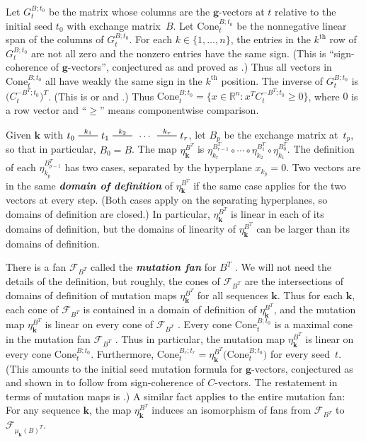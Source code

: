 \documentclass{amsart}
\theoremstyle{definition}
\theoremstyle{remark}
\numberwithin{equation}{section}
\newcommand{\newword}[1]{\textbf{\emph{#1}}}
\newcommand{\reals}{\mathbb R}
\newcommand{\edge}{\,\,\rule[2.7pt]{20pt}{0.5pt}\,\,}
\newcommand{\set}[1]{{\lbrace #1 \rbrace}}
\newcommand{\sett}[1]{{\bigl\lbrace #1 \bigr\rbrace}}
\newcommand{\F}{{\mathcal F}}
\renewcommand{\th}{^\text{th}}
\newcommand{\0}{{\mathbf{0}}}
\newcommand{\Cone}{\mathrm{Cone}}
\newcommand{\g}{\mathbf{g}}
\newcommand{\kk}{{\boldsymbol{k}}}
\renewcommand{\th}{^\text{th}}
\begin{document}
Let $G_t^{B;t_0}$ be the matrix whose columns are the $\g$-vectors at $t$ relative to the initial seed $t_0$ with exchange matrix~$B$.
Let $\Cone^{B;t_0}_t$ be the nonnegative linear span of the columns of $G_t^{B;t_0}$.
For each $k\in\set{1,\ldots,n}$, the entries in the $k\th$ row of $G_t^{B;t_0}$ are not all zero and the nonzero entries have the same sign.
(This is ``sign-coherence of $\g$-vectors'', conjectured as \cite[Conjecture~6.13]{ca4} and proved as \cite[Theorem 5.11]{GHKK}.)
Thus all vectors in $\Cone^{B;t_0}_t$ all have weakly the same sign in the $k\th$ position.
The inverse of $G_t^{B;t_0}$ is $\bigl(C_t^{-B^T;t_0}\bigr)^T$.
(This is \cite[Theorem~1.2]{NZ} or \cite[Theorem~1.1]{framework} and \cite[Theorem~3.30]{framework}.)
Thus $\Cone^{B;t_0}_t=\sett{x\in\reals^n:x^TC_t^{-B^T;t_0}\ge0}$, where $0$ is a row vector and ``$\ge$'' means componentwise comparison. 

Given $\kk$ with $t_0\overset{k_1}{\edge}t_1\overset{k_2}{\edge}\,\cdots\,\overset{k_r}{\edge}t_r$, let $B_p$ be the exchange matrix at~$t_p$, so that in particular, $B_0=B$.
The map $\eta_{\kk}^{B^T}$ is ${\eta_{k_r}^{B_{r-1}^T}\circ\cdots\circ\eta_{k_2}^{B_1^T}\circ\eta_{k_1}^{B_0^T}}$.
The definition of each $\eta_{k_p}^{B_{p-1}^T}$ has two cases, separated by the hyperplane $x_{k_p}=0$.
Two vectors are in the same \newword{domain of definition} of $\eta_\kk^{B^T}$ if the same case applies for the two vectors at every step.
(Both cases apply on the separating hyperplanes, so domains of definition are closed.)
In particular, $\eta_\kk^{B^T}$ is linear in each of its domains of definition, but the domains of linearity of $\eta_\kk^{B^T}$ can be larger than its domains of definition.

There is a fan $\F_{B^T}$ called the \newword{mutation fan} for $B^T$ \cite[Definition~5.12]{universal}.
We will not need the details of the definition, but roughly, the cones of $\F_{B^T}$ are the intersections of domains of definition of mutation maps $\eta_\kk^{B^T}$ for all sequences $\kk$.
Thus for each $\kk$, each cone of $\F_{B^T}$ is contained in a domain of definition of $\eta_\kk^{B^T}$, and the mutation map $\eta_\kk^{B^T}$ is linear on every cone of $\F_{B^T}$ \cite[Proposition~5.3]{universal}.
Every cone $\Cone^{B;t_0}_t$ is a maximal cone in the mutation fan $\F_{B^T}$ \cite[Proposition~8.13]{universal}.
Thus in particular, the mutation map $\eta_\kk^{B^T}$ is linear on every cone $\Cone^{B;t_0}_t$.
Furthermore, $\Cone_t^{B_r;t_r}=\eta_\kk^{B^T}\bigl(\Cone_t^{B;t_0}\bigr)$ for every seed~$t$.
(This amounts to the initial seed mutation formula for $\g$-vectors, conjectured as \cite[Conjecture~7.12]{ca4} and shown in \cite[Proposition~4.2(v)]{NZ} to follow from sign-coherence of $C$-vectors.
The restatement in terms of mutation maps is \cite[Conjecture~8.11]{universal}.)
A similar fact applies to the entire mutation fan:
For any sequence $\kk$, the map $\eta_\kk^{B^T}$ induces an isomorphism of fans \cite[Proposition~7.3]{universal} from $\F_{B^T}$ to $\F_{\mu_\kk(B)^T}$.
\end{document}
